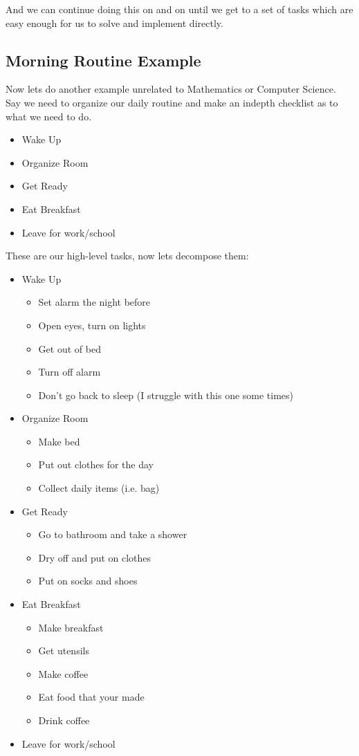 \documentclass[12pt,a4paper]{book}
\begin{document}
				And we can continue doing this on and on until we get to a set of tasks which are easy enough for us to solve and implement directly. 
				
		\subsection{Morning Routine Example}
			Now lets do another example unrelated to Mathematics or Computer Science. Say we need to organize our daily routine and make an indepth checklist as to what we need to do.
			\begin{itemize}
				\item Wake Up
				\item Organize Room
				\item Get Ready
				\item Eat Breakfast
				\item Leave for work/school
			\end{itemize}
			These are our high-level tasks, now lets decompose them:
			\begin{itemize}
				\item Wake Up
					\begin{itemize}
						\item Set alarm the night before
						\item Open eyes, turn on lights
						\item Get out of bed
						\item Turn off alarm
						\item Don't go back to sleep (I struggle with this one some times)
					\end{itemize}
				\item Organize Room
					\begin{itemize}
						\item Make bed
						\item Put out clothes for the day
						\item Collect daily items (i.e. bag)
					\end{itemize}
				\item Get Ready
					\begin{itemize}
						\item Go to bathroom and take a shower
						\item Dry off and put on clothes
						\item Put on socks and shoes
					\end{itemize}	
				\item Eat Breakfast
					\begin{itemize}
						\item Make breakfast
						\item Get utensils
						\item Make coffee
						\item Eat food that your made
						\item Drink coffee
					\end{itemize}
				\item Leave for work/school
			\end{itemize}
\end{document}
